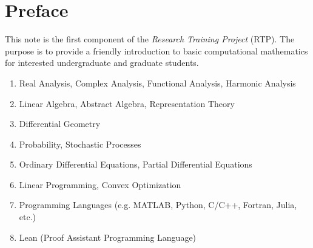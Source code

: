 \chapter*{Preface}

This note is the first component of the \emph{Research Training Project} (RTP).  The purpose is to provide a friendly introduction to basic computational mathematics for interested undergraduate and graduate students.
\vspace{2cm}

{}

\begin{enumerate}
    \item Real Analysis, Complex Analysis, Functional Analysis, Harmonic Analysis
    \item Linear Algebra, Abstract Algebra, Representation Theory
    \item Differential Geometry
    \item Probability, Stochastic Processes
    \item Ordinary Differential Equations, Partial Differential Equations 
    \item Linear Programming, Convex Optimization
    \item Programming Languages (e.g. MATLAB, Python, C/C++, Fortran, Julia, etc.)
    \item Lean (Proof Assistant Programming Language)
\end{enumerate}